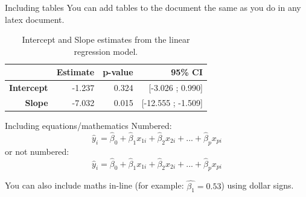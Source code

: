 \begin{frame}{Including tables}
You can add tables to the document the same as you do in any latex document.  

\begin{table}[H]
    \centering
    \caption{Intercept and Slope estimates from the linear regression model.}
    \begin{tabular}{rrrr}
    \hline
     & \textbf{Estimate} & \textbf{p-value} & \textbf{95\% CI} \\
    \hline
    \textbf{Intercept} & -1.237 & 0.324 & [-3.026 ; 0.990]\\
    \textbf{Slope} & -7.032 & 0.015 & [-12.555 ; -1.509] \\
    \hline
    \end{tabular}
    \label{tab:reg_est}
\end{table}

\end{frame}


\begin{frame}{Including equations/mathematics}
Numbered:
\begin{equation}
    \hat{y}_i = \hat{\beta}_0 + \hat{\beta}_1 x_{1i} + \hat{\beta}_{2} x_{2i} +...+ \hat{\beta}_p x_{pi}
\end{equation}
or not numbered:
\begin{equation*}
    \hat{y}_i = \hat{\beta}_0 + \hat{\beta}_1 x_{1i} + \hat{\beta}_{2} x_{2i} +...+ \hat{\beta}_p x_{pi}
\end{equation*}

You can also include maths in-line (for example: $\hat{\beta_1} = 0.53$) using dollar signs.

\end{frame}